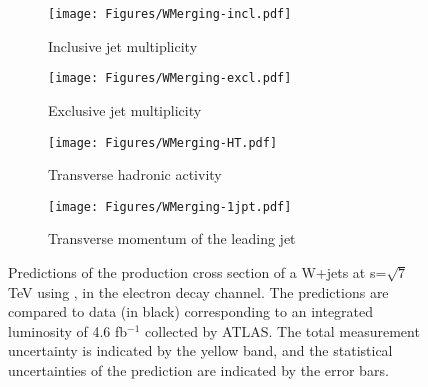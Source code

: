 \begin{figure}[ht] 
  \begin{subfigure}[b]{0.5\linewidth}
    \centering
        \texttt{[image: Figures/WMerging-incl.pdf]} 
    \caption{Inclusive jet multiplicity} 
    \label{fig9:a} 
    \vspace{4ex}
  \end{subfigure}%
  \begin{subfigure}[b]{0.5\linewidth}
    \centering
    \texttt{[image: Figures/WMerging-excl.pdf]}
    \caption{Exclusive jet multiplicity} 
    \label{fig9:b} 
    \vspace{4ex}
  \end{subfigure} 
  \begin{subfigure}[b]{0.5\linewidth}
    \centering
    \texttt{[image: Figures/WMerging-HT.pdf]}
    \caption{Transverse hadronic activity} 
    \label{fig9:c} 
  \end{subfigure}%
  \begin{subfigure}[b]{0.5\linewidth}
    \centering
    \texttt{[image: Figures/WMerging-1jpt.pdf]}
    \caption{Transverse momentum of the leading jet} 
    \label{fig9:d} 
  \end{subfigure} 
  \caption{Predictions of the production cross section of a W+jets at s=$\sqrt{7}$ TeV using , in the electron decay channel. The predictions are compared to data (in black) corresponding to an integrated luminosity of 4.6  fb$^{-1}$ collected by ATLAS. The total measurement uncertainty is indicated by the yellow band, and the statistical uncertainties of the prediction are indicated by the error bars.}
  \label{fig9} 
\end{figure}
